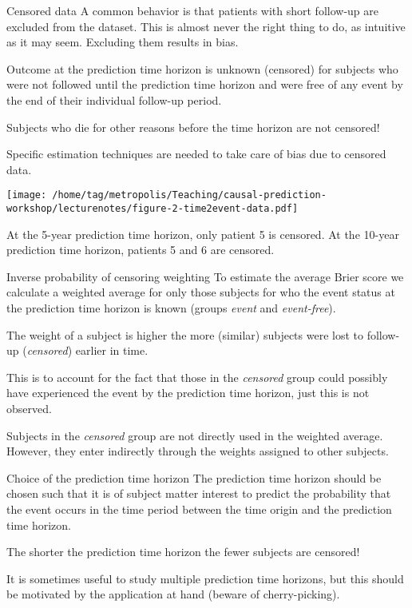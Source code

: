 \documentclass{beamer}\usepackage{listings}
\begin{document}
\begin{frame}[label={sec:org0c59a7c}]{Censored data}
A common behavior is that patients with short follow-up are excluded
from the dataset. This is almost never the right thing to do, as
intuitive as it may seem. Excluding them results in bias.
\vfill

Outcome at the prediction time horizon is unknown (censored) for
subjects who were not followed until the prediction time horizon and
were free of any event by the end of their individual follow-up
period.  \vfill

Subjects who die for other reasons before the time horizon are not censored!

\vfill
Specific estimation techniques are needed to take care of bias due to
censored data.
\end{frame}
\begin{frame}[label={sec:org2acabac},shrink=25]{}
\begin{center}
\texttt{[image: /home/tag/metropolis/Teaching/causal-prediction-workshop/lecturenotes/figure-2-time2event-data.pdf]}
\end{center}

At the 5-year prediction time horizon, only patient 5 is censored. At
the 10-year prediction time horizon, patients 5 and 6 are censored.
\end{frame}
\begin{frame}[label={sec:orgd72a7f1}]{Inverse probability of censoring weighting}
To estimate the average Brier score we calculate a weighted average
for only those subjects for who the event status
at the prediction time horizon is known (groups \emph{event} and
\emph{event-free}).

\vfill The weight of a subject is higher the more (similar) subjects
were lost to follow-up (\emph{censored}) earlier in time.

\vfill This is to account for the fact that those in the \emph{censored}
group could possibly have experienced the event by the prediction time
horizon, just this is not observed.

\vfill
Subjects in the \emph{censored} group are not directly used in
the weighted average. However, they enter indirectly through the
weights assigned to other subjects.  
\end{frame}
\begin{frame}[label={sec:orgad11501}]{Choice of the prediction time horizon}
The prediction time horizon should be chosen such that it is of
subject matter interest to predict the probability that the event
occurs in the time period between the time origin and the prediction
time horizon.
\vfill

The shorter the prediction time horizon the fewer subjects are
censored!
\vfill

It is sometimes useful to study multiple
prediction time horizons, but this should be motivated by the
application at hand (beware of cherry-picking).
\end{frame}
\end{document}
